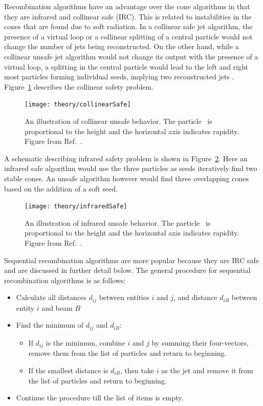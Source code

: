 Recombination algorithms have an advantage over the cone algorithms in that they are infrared and collinear safe (IRC).
This is related to instabilities in the cones that are found due to soft radiation.
In a collinear safe jet algorithm, the presence of a virtual loop or a collinear splitting of a central particle would not change the number of jets being reconstructed.
On the other hand, while a collinear unsafe jet algorithm would not change its output with the presence of a virtual loop, a splitting in the central particle would lead to the left and right most particles forming individual seeds, implying two reconstructed jets \cite{Salam:2009jx}.
Figure~\ref{fig:collinearSafe} describes the collinear safety problem.

\begin{figure}[htp]
\centering
\texttt{[image: theory/collinearSafe]}
\caption{An illustration of collinear unsafe behavior.
The particle \pt\ is proportional to the height and the horizontal axis indicates rapidity.
Figure from Ref.~\cite{Salam:2009jx}.}
\label{fig:collinearSafe}
\end{figure}

A schematic describing infrared safety problem is shown in Figure~\ref{fig:infraredSafe}.
Here an infrared safe algorithm would use the three particles as seeds iteratively find two stable cones.
An unsafe algorithm however would find three overlapping cones based on the addition of a soft seed.

\begin{figure}[htp]
\centering
\texttt{[image: theory/infraredSafe]}
\caption{An illustration of infrared unsafe behavior.
The particle \pt\ is proportional to the height and the horizontal axis indicates rapidity.
Figure from Ref.~\cite{Salam_2007}.}
\label{fig:infraredSafe}
\end{figure}

Sequential recombination algorithms are more popular because they are IRC safe and are discussed in further detail below. 
The general procedure for sequential recombination algorithms is as follows:
\begin{itemize}
\item Calculate all distances $d_{ij}$ between entities $i$ and $j$, and distance $d_{iB}$ between entity $i$ and beam $B$
\item Find the minimum of $d_{ij}$ and $d_{iB}$:
\begin{itemize}
\item If $d_{ij}$ is the minimum, combine $i$ and $j$ by summing their four-vectors, remove them from the list of particles and return to beginning.
\item If the smallest distance is $d_{iB}$, then take $i$ as the jet and remove it from the list of particles and return to beginning.
\end{itemize}
\item Continue the procedure till the list of items is empty.
\end{itemize}


